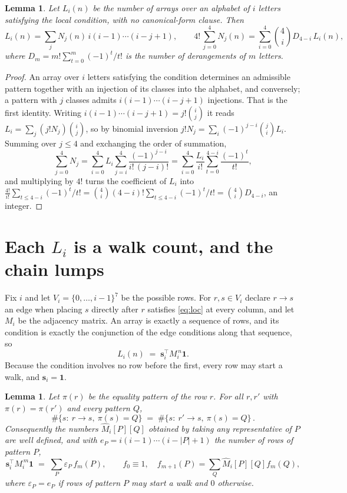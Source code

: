 \documentclass[11pt,a4paper]{article}
\theoremstyle{plain}
\newtheorem{lemma}[theorem]{Lemma}
\theoremstyle{definition}
\begin{document}
\begin{lemma}\label{lem:inv}
Let $L_i(n)$ be the number of arrays over an alphabet of $i$ letters satisfying the local
condition, with no canonical-form clause. Then
\[
L_i(n)=\sum_j N_j(n)\,i(i-1)\cdots(i-j+1),
\qquad
4!\,\sum_{j=0}^{4}N_j(n)=\sum_{i=0}^{4}\binom{4}{i}D_{4-i}\,L_i(n),
\]
where $D_m=m!\sum_{t=0}^{m}(-1)^t/t!$ is the number of derangements of $m$ letters.
\end{lemma}

\begin{proof}
An array over $i$ letters satisfying the condition determines an admissible pattern together
with an injection of its classes into the alphabet, and conversely; a pattern with $j$
classes admits $i(i-1)\cdots(i-j+1)$ injections. That is the first identity. Writing
$i(i-1)\cdots(i-j+1)=j!\binom{i}{j}$ it reads $L_i=\sum_j (j!N_j)\binom{i}{j}$, so by
binomial inversion $j!N_j=\sum_{i}(-1)^{j-i}\binom{j}{i}L_i$. Summing over
$j\le 4$ and exchanging the order of summation,
\[
\sum_{j=0}^{4}N_j=\sum_{i=0}^{4}L_i\sum_{j=i}^{4}\frac{(-1)^{j-i}}{i!\,(j-i)!}
=\sum_{i=0}^{4}\frac{L_i}{i!}\sum_{t=0}^{4-i}\frac{(-1)^t}{t!} ,
\]
and multiplying by $4!$ turns the coefficient of $L_i$ into
$\frac{4!}{i!}\sum_{t\le 4-i}(-1)^t/t!=\binom{4}{i}(4-i)!\sum_{t\le 4-i}(-1)^t/t!
=\binom{4}{i}D_{4-i}$, an integer.
\end{proof}

\section{Each $L_i$ is a walk count, and the chain lumps}

Fix $i$ and let $V_i=\{0,\dots,i-1\}^{7}$ be the possible rows. For $r,s\in V_i$
declare $r\to s$ an edge when placing $s$ directly after $r$ satisfies \eqref{eq:loc} at
every column, and let $M_i$ be the adjacency matrix. An array is exactly a sequence of
rows, and its condition is exactly the conjunction of the edge conditions along that
sequence, so
\[
L_i(n)\;=\;\mathbf{s}_i^{\!\top}M_i^{\,n}\mathbf{1} .
\]
Because the condition involves no row before the first, every
row may start a walk, and $\mathbf{s}_i=\mathbf{1}$.

\begin{lemma}\label{lem:lump}
Let $\pi(r)$ be the equality pattern of the row $r$. For all $r,r'$ with
$\pi(r)=\pi(r')$ and every pattern $Q$,
\[
\#\{s:\ r\to s,\ \pi(s)=Q\}\;=\;\#\{s:\ r'\to s,\ \pi(s)=Q\}\, .
\]
Consequently the numbers $\widehat M_i[P][Q]$ obtained by taking any representative of $P$
are well defined, and with $e_P=i(i-1)\cdots(i-|P|+1)$ the number of rows of pattern $P$,
\[
\mathbf{s}_i^{\!\top}M_i^{\,m}\mathbf{1}\;=\;\sum_P \varepsilon_P\,f_m(P),
\qquad f_0\equiv1,\quad f_{m+1}(P)=\sum_Q\widehat M_i[P][Q]f_m(Q),
\]
where $\varepsilon_P=e_P$ if rows of pattern $P$ may start a walk and $0$ otherwise.
\end{lemma}
\end{document}
